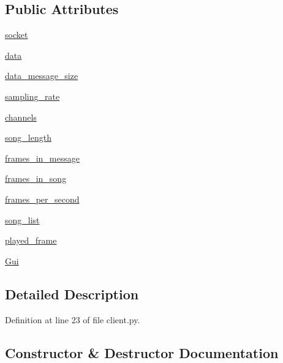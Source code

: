 \subsection*{Public Attributes}
\begin{DoxyCompactItemize}
\item 
\mbox{\hyperlink{classclient_1_1_client_a2c7ab020d8f44b7a1dc077933e479cfc}{socket}}
\item 
\mbox{\hyperlink{classclient_1_1_client_a4cd9cd6ca5116719e5740d8c613aa6fd}{data}}
\item 
\mbox{\hyperlink{classclient_1_1_client_af916950def51076b8715dc10d1ac33fb}{data\+\_\+message\+\_\+size}}
\item 
\mbox{\hyperlink{classclient_1_1_client_af3c9a34b9f0d62a92e01701947fef518}{sampling\+\_\+rate}}
\item 
\mbox{\hyperlink{classclient_1_1_client_a4a1d5324e5bcc2a81ad4e99855b54e8b}{channels}}
\item 
\mbox{\hyperlink{classclient_1_1_client_a3dfc5ac11c107b242739a343e1cee50a}{song\+\_\+length}}
\item 
\mbox{\hyperlink{classclient_1_1_client_a289a3c3b991b668b7882d63fae2665ed}{frames\+\_\+in\+\_\+message}}
\item 
\mbox{\hyperlink{classclient_1_1_client_a9197b1ec397247b35331e63bf1d9e92d}{frames\+\_\+in\+\_\+song}}
\item 
\mbox{\hyperlink{classclient_1_1_client_a2425db200753df47f64e4dcdee52c829}{frames\+\_\+per\+\_\+second}}
\item 
\mbox{\hyperlink{classclient_1_1_client_a7be73ebcc2918382399a9d3caa253ab7}{song\+\_\+list}}
\item 
\mbox{\hyperlink{classclient_1_1_client_a1028108df48bb52904833cff2f27eb1f}{played\+\_\+frame}}
\item 
\mbox{\hyperlink{classclient_1_1_client_adaa3a6454a17be267126d15ce2529df1}{Gui}}
\end{DoxyCompactItemize}


\subsection{Detailed Description}


Definition at line 23 of file client.\+py.



\subsection{Constructor \& Destructor Documentation}
\mbox{\label{classclient_1_1_client_a69d3065fc7ea0880083203666659cd3d}} 
